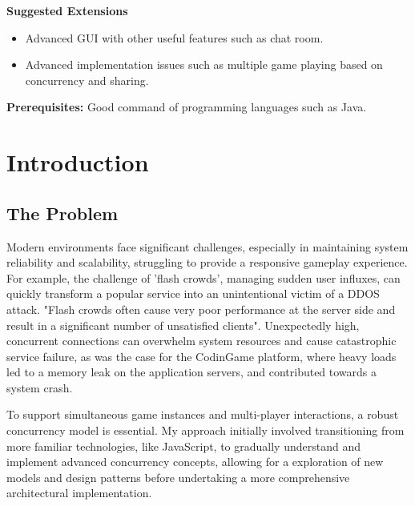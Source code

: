 \documentclass[]{final}
\begin{document}
\textbf{Suggested Extensions}
\begin{itemize}
  \item Advanced GUI with other useful features such as chat room.
  \item Advanced implementation issues such as multiple game playing based on concurrency and sharing.
\end{itemize}

\textbf{Prerequisites:} Good command of programming languages such as Java.


\chapter{Introduction}
\section{The Problem}
Modern environments face significant challenges, especially in maintaining
system reliability and scalability, struggling to provide a responsive gameplay
experience. For example, the challenge of 'flash crowds', managing sudden user influxes,
can quickly transform a popular service into an unintentional victim of a
DDOS attack. "Flash crowds often cause very poor performance
at the server side and result in a significant number of unsatisfied
clients"\cite{Ari_crss_nodate}. Unexpectedly high, concurrent connections can overwhelm
system resources and cause catastrophic service failure, as was the case for
the CodinGame platform, where heavy loads led to a memory leak on the application
servers, and contributed towards a system crash\cite{jobert_story_2017}.

To support simultaneous game instances and multi-player interactions,
a robust concurrency model is essential. My approach initially involved
transitioning from more familiar technologies, like JavaScript, to
gradually understand and implement advanced concurrency concepts,
allowing for a exploration of new models and design patterns before
undertaking a more comprehensive architectural implementation.

\end{document}
